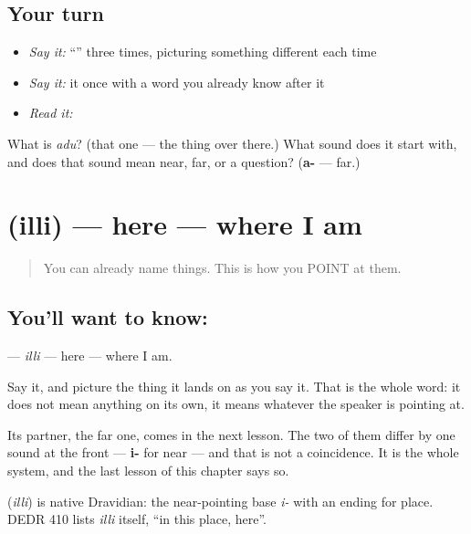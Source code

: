 \subsection*{Your turn}
\begin{itemize}
\raggedright
  \item \emph{Say it:} \textquotedblleft{}\textquotedblright{} three times, picturing something different each time
  \item \emph{Say it:} it once with a word you already know after it
  \item \emph{Read it:} \textbf{}
\end{itemize}

\begin{tcolorbox}[breakable,colback=teal!4,colframe=teal!35!black,title={Before you move on}]
What is \emph{adu}? (that one — the thing over there.) What sound does it start with, and does that sound mean near, far, or a question? (\textbf{a-} — far.)
\end{tcolorbox}
\section[\texorpdfstring{\kn{ಇಲ್ಲಿ} (illi)}{ಇಲ್ಲಿ (illi)}]{ (illi) — here — where I am}

\label{lesson:KA-C41-here}



\begin{quote}
You can already name things. This is how you POINT at them.
\end{quote}

\subsection*{You'll want to know: }
\textbf{} — \emph{illi} — here — where I am.

Say it, and picture the thing it lands on as you say it. That is the whole word: it does not mean anything on its own, it means whatever the speaker is pointing at.

Its partner, the far one, comes in the next lesson. The two of them differ by one sound at the front — \textbf{i-} for near — and that is not a coincidence. It is the whole system, and the last lesson of this chapter says so.

\begin{cousinweb}
\textbf{} (\emph{illi}) is native Dravidian: the near-pointing base \emph{i-} with an ending for place. DEDR 410 lists \emph{illi} itself, \textquotedblleft{}in this place, here\textquotedblright{}.
\end{cousinweb}

